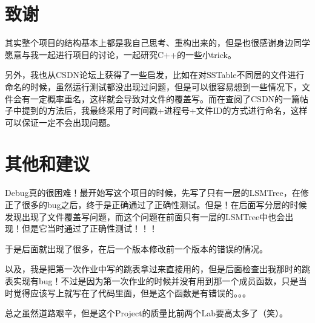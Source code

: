 \documentclass{article}
\begin{document}
\section{致谢}

其实整个项目的结构基本上都是我自己思考、重构出来的，但是也很感谢身边同学愿意与我一起进行项目的讨论，一起研究C++的一些小trick。

另外，我也从CSDN论坛上获得了一些启发，比如在对SSTable不同层的文件进行命名的时候，虽然运行测试都没出现过问题，但是可以很容易想到一些情况下，文件会有一定概率重名，这样就会导致对文件的覆盖写。而在查阅了CSDN的一篇帖子中提到的方法后，我最终采用了时间戳+进程号+文件ID的方式进行命名，这样可以保证一定不会出现问题。


\section{其他和建议}

Debug真的很困难！最开始写这个项目的时候，先写了只有一层的LSMTree，在修正了很多的bug之后，终于是正确通过了正确性测试。但是！在后面写分层的时候发现出现了文件覆盖写问题，而这个问题在前面只有一层的LSMTree中也会出现！但是它当时通过了正确性测试！！！

于是后面就出现了很多，在后一个版本修改前一个版本的错误的情况。

以及，我是把第一次作业中写的跳表拿过来直接用的，但是后面检查出我那时的跳表实现有bug！不过是因为第一次作业的时候并没有用到那一个成员函数，只是当时觉得应该写上就写在了代码里面，但是这个函数是有错误的。。。

总之虽然道路艰辛，但是这个Project的质量比前两个Lab要高太多了（笑）。
\end{document}
